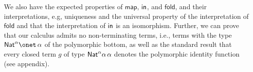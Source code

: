 \documentclass[runningheads]{llncs}
\newcommand{\map}{\mathsf{map}}
\newcommand{\fold}{\mathsf{fold}}
\begin{document}
  
\noindent
We also have the expected properties of $\map$, $\mathsf{in}$, and $\fold$,
and their interpretations, e.g, uniqueness and the universal property
of the interpretation of $\fold$ and that the interpretation of $\mathsf{in}$
is an isomorphism. Further, we can prove that our calculus admits no
non-terminating terms, i.e., terms with the
type $\Nat^\alpha \onet \,\alpha$ of the polymorphic bottom, as well
as the standard result that every closed term $g$ of type
$\mathsf{Nat}^\alpha\alpha\,\alpha$ denotes the polymorphic identity function
{\color{red} (see appendix)}.


\begin{comment}
\subsection{Properties of Terms of $\Nat$-Type}\label{sec:Nat-type-terms}


\end{comment}
\end{document}
